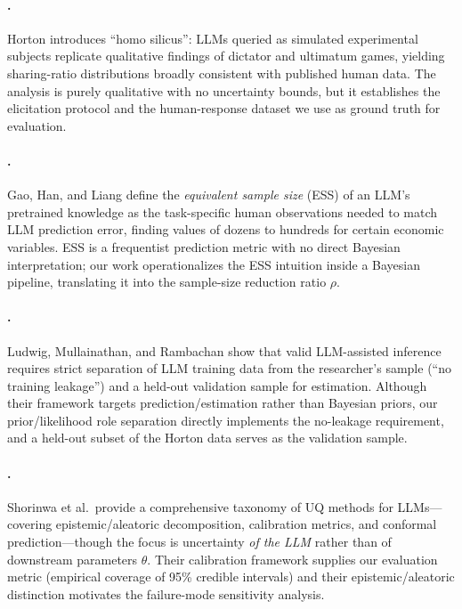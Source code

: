 \documentclass[11pt]{article}
\begin{document}
\paragraph{\citet{horton2023homosilicus}.}
Horton introduces ``homo silicus'': LLMs queried as simulated
experimental subjects replicate qualitative findings of dictator and
ultimatum games, yielding sharing-ratio distributions broadly
consistent with published human data.
The analysis is purely qualitative with no uncertainty bounds, but it
establishes the elicitation protocol and the human-response dataset we
use as ground truth for evaluation.

\paragraph{\citet{gao2026measure}.}
Gao, Han, and Liang define the \emph{equivalent sample size} (ESS) of
an LLM's pretrained knowledge as the task-specific human observations
needed to match LLM prediction error, finding values of dozens to
hundreds for certain economic variables.
ESS is a frequentist prediction metric with no direct Bayesian
interpretation; our work operationalizes the ESS intuition inside a
Bayesian pipeline, translating it into the sample-size reduction ratio
$\rho$.

\paragraph{\citet{ludwig2025econometrics}.}
Ludwig, Mullainathan, and Rambachan show that valid LLM-assisted
inference requires strict separation of LLM training data from the
researcher's sample (``no training leakage'') and a held-out
validation sample for estimation.
Although their framework targets prediction/estimation rather than
Bayesian priors, our prior/likelihood role separation directly
implements the no-leakage requirement, and a held-out subset of the
Horton data serves as the validation sample.

\paragraph{\citet{shorinwa2025survey}.}
Shorinwa et al.\ provide a comprehensive taxonomy of UQ methods for
LLMs---covering epistemic/aleatoric decomposition, calibration
metrics, and conformal prediction---though the focus is uncertainty
\emph{of the LLM} rather than of downstream parameters $\theta$.
Their calibration framework supplies our evaluation metric (empirical
coverage of 95\% credible intervals) and their epistemic/aleatoric
distinction motivates the failure-mode sensitivity analysis.
\end{document}
